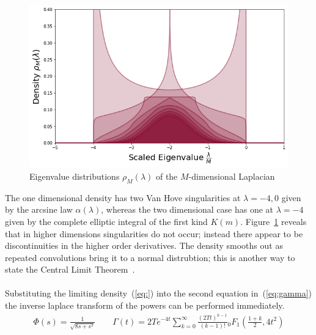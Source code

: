 \documentclass{article}[12pt]
\numberwithin{equation}{section}
\begin{document}
\begin{figure}[H]
\centering{}
\captionsetup{justification=centering}
\includegraphics[scale=0.45]{figures/density}
\caption{Eigenvalue distributions $\rho_M(\lambda)$ of the $M$-dimensional Laplacian}
\label{fig:dos}
\end{figure}
\noindent
The one dimensional density has two Van Hove singularities at $\lambda=-4,0$
given by the arcsine law $\alpha(\lambda)$, whereas the two dimensional
case has one at $\lambda=-4$ given by the complete elliptic integral
of the first kind $K(m)$. Figure~\ref{fig:dos} reveals that in higher
dimensions singularities do not occur; instead there appear to be
discontinuities in the higher order derivatives. The density smooths out
as repeated convolutions bring it to a normal distrubtion; this is another
way to state the Central Limit Theorem~\cite{}.
\\\\
Substituting the limiting density~(\ref{eq:}) into the second equation
in~(\ref{eq:gamma}) the inverse laplace transform of the powers can be
performed immediately.
\begin{align}
  \Phi(s)=\frac{1}{\sqrt{8s + s^2}}
  \qquad
  \Gamma(t)=2Te^{-4t}
  \sum_{k=0}^{\infty}\frac{(2Tt)^{k-1}}{(k-1)!}
  {}_0F_1(\frac{1+k}{2},4t^2)
\end{align}
\end{document}
